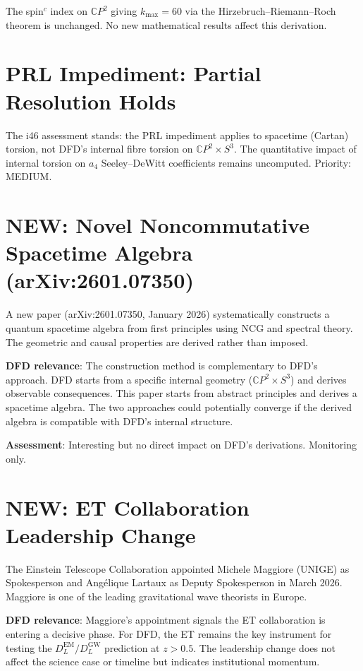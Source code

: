 \documentclass[11pt,a4paper]{article}
\newcommand{\NEW}{\textcolor{dfdblue}{\textbf{NEW}}}
\newcommand{\CP}{\mathbb{C}P}
\begin{document}
The spin$^c$ index on $\CP^2$ giving $k_{\max} = 60$ via the Hirzebruch--Riemann--Roch theorem is unchanged. No new mathematical results affect this derivation.

\section{PRL Impediment: Partial Resolution Holds}

The i46 assessment stands: the PRL impediment applies to spacetime (Cartan) torsion, not DFD's internal fibre torsion on $\CP^2 \times S^3$. The quantitative impact of internal torsion on $a_4$ Seeley--DeWitt coefficients remains uncomputed. Priority: MEDIUM.

\section{\NEW: Novel Noncommutative Spacetime Algebra (arXiv:2601.07350)}

\begin{tcolorbox}[colback=blue!5!white, colframe=blue!60!black,
  title={January 2026: Systematic Construction of Quantum Spacetime Algebra}]

A new paper (arXiv:2601.07350, January 2026) systematically constructs a quantum spacetime algebra from first principles using NCG and spectral theory. The geometric and causal properties are derived rather than imposed.

\textbf{DFD relevance}: The construction method is complementary to DFD's approach. DFD starts from a specific internal geometry ($\CP^2 \times S^3$) and derives observable consequences. This paper starts from abstract principles and derives a spacetime algebra. The two approaches could potentially converge if the derived algebra is compatible with DFD's internal structure.

\textbf{Assessment}: Interesting but no direct impact on DFD's derivations. Monitoring only.
\end{tcolorbox}

\section{\NEW: ET Collaboration Leadership Change}

\begin{tcolorbox}[colback=blue!5!white, colframe=blue!60!black,
  title={March 2026: Michele Maggiore Appointed ET Spokesperson}]

The Einstein Telescope Collaboration appointed Michele Maggiore (UNIGE) as Spokesperson and Ang\'{e}lique Lartaux as Deputy Spokesperson in March 2026. Maggiore is one of the leading gravitational wave theorists in Europe.

\textbf{DFD relevance}: Maggiore's appointment signals the ET collaboration is entering a decisive phase. For DFD, the ET remains the key instrument for testing the $D_L^{\text{EM}}/D_L^{\text{GW}}$ prediction at $z > 0.5$. The leadership change does not affect the science case or timeline but indicates institutional momentum.
\end{tcolorbox}
\end{document}
